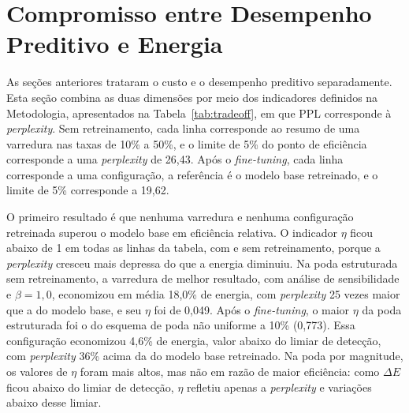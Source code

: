 \section{Compromisso entre Desempenho Preditivo e Energia}\label{sec:res_tradeoff}

As seções anteriores trataram o custo e o desempenho preditivo separadamente. Esta seção
combina as duas dimensões por meio dos indicadores definidos na
Metodologia, apresentados na Tabela~\ref{tab:tradeoff}, em que PPL
corresponde à \textit{perplexity}. Sem retreinamento, cada linha corresponde ao resumo de uma
varredura nas taxas de 10\% a 50\%, e o limite de 5\% do ponto de eficiência corresponde a uma
\textit{perplexity} de 26,43. Após o \textit{fine-tuning}, cada linha corresponde a uma
configuração, a referência é o modelo base retreinado, e o limite de 5\% corresponde a 19,62.

\begin{table}[htb]
\centering
\caption{Indicadores de compromisso entre desempenho preditivo e energia.}
\label{tab:tradeoff}
\small

\end{table}

O primeiro resultado é que nenhuma varredura e nenhuma configuração retreinada superou o modelo
base em eficiência relativa. O indicador $\eta$ ficou abaixo de 1 em todas as linhas da tabela,
com e sem retreinamento, porque a \textit{perplexity} cresceu mais depressa do que a energia
diminuiu. Na poda estruturada sem retreinamento, a varredura de melhor resultado, com análise
de sensibilidade e $\beta = 1{,}0$, economizou em média 18,0\% de energia, com
\textit{perplexity} 25 vezes maior que a do modelo base, e seu $\eta$ foi de 0,049. Após o
\textit{fine-tuning}, o maior $\eta$ da poda estruturada foi o do esquema de poda não uniforme
a 10\% (0,773). Essa configuração economizou 4,6\% de energia, valor abaixo do limiar de
detecção, com \textit{perplexity} 36\% acima da do modelo base retreinado. Na poda por
magnitude, os valores de $\eta$ foram mais altos, mas não em razão de maior eficiência: como
$\Delta E$ ficou abaixo do limiar de detecção, $\eta$ refletiu
apenas a \textit{perplexity} e variações abaixo desse limiar.

